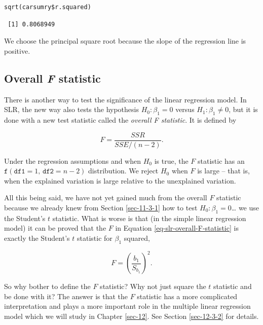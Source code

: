 \documentclass[captions=tableheading]{scrbook}
\begin{document}
\lstset{language=R}
\begin{lstlisting}
sqrt(carsumry$r.squared)
\end{lstlisting}

\begin{verbatim}
 [1] 0.8068949
\end{verbatim}

We choose the principal square root because the slope of the regression line is positive.
\subsection{Overall \emph{F} statistic}
\label{sec-11-3-3}
\label{sub-slr-overall-F-statistic}


There is another way to test the significance of the linear regression model. In SLR, the new way also tests the hypothesis \(H_{0}:\beta_{1}=0\) versus \(H_{1}:\beta_{1}\neq0\), but it is done with a new test statistic called the \emph{overall F statistic}. It is defined by

\begin{equation}
F=\frac{SSR}{SSE/(n-2)}.\label{eq-slr-overall-F-statistic}
\end{equation}

Under the regression assumptions and when \(H_{0}\) is true, the \(F\) statistic has an \(\mathtt{f}(\mathtt{df1}=1,\,\mathtt{df2}=n-2)\) distribution. We reject \(H_{0}\) when \(F\) is large -- that is, when the explained variation is large relative to the unexplained variation.

All this being said, we have not yet gained much from the overall \(F\) statistic because we already knew from Section \ref{sec-11-3-1} how to test \(H_{0}:\beta_{1}=0\)\ldots{} we use the Student's \(t\) statistic. What is worse is that (in the simple linear regression model) it can be proved that the \(F\) in Equation \ref{eq-slr-overall-F-statistic} is exactly the Student's \(t\) statistic for \(\beta_{1}\) squared,

\begin{equation}
F=\left(\frac{b_{1}}{S_{b_{1}}}\right)^{2}.
\end{equation}

So why bother to define the \(F\) statistic? Why not just square the \(t\) statistic and be done with it? The answer is that the \(F\) statistic has a more complicated interpretation and plays a more important role in the multiple linear regression model which we will study in Chapter \ref{sec-12}. See Section \ref{sec-12-3-2} for details.
\end{document}
